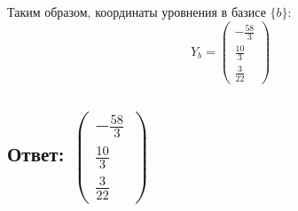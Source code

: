 \documentclass{article}
\begin{document}
        
        Таким образом, координаты уровнения в базисе  $\{b\}$:
        \[
        Y_b = \left(
        \begin{array}{c}
        -\frac{58}{3} \\
        \frac{10}{3} \\
        \frac{3}{22}
        \end{array}
        \right)
        \]
        
        \subsection{Ответ: $ \left(
        \begin{array}{c}
        -\frac{58}{3} \\
        \frac{10}{3} \\
        \frac{3}{22}
        \end{array}
        \right)$}
            
        

    
 
        
        
\end{document}
